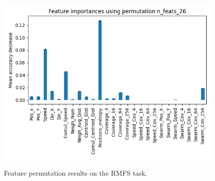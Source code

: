 \documentclass[../../Thesis.tex]{subfiles}
\begin{document}
\begin{figure}
{							\includegraphics[scale=0.31]{../../Images/Experiments/warehouse_images/Feature_importances_using_permutation_n_feats_26.png}
					}
					\caption{Feature permutation results on the RMFS task.}
					\label{fig:RMFS_feature_permutation}
				\end{figure}
\end{document}
